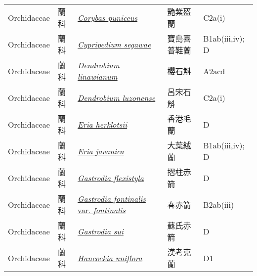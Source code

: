 {\begin{longtable}{p{2.5cm}p{2.5cm}p{4.5cm}p{2.5cm}p{3cm}}
    Orchidaceae & 蘭科 & \href{http://www.theplantlist.org/tpl1.1/search?q=Corybas+puniceus}{\textit{Corybas puniceus} } & 艷紫盔蘭 & C2a(i) \index{Corybas@\textit{Corybas}!puniceus@\textit{puniceus}}  \index{艷紫盔蘭} \\
    Orchidaceae & 蘭科 & \href{http://www.theplantlist.org/tpl1.1/search?q=Cypripedium+segawae}{\textit{Cypripedium segawae} } & 寶島喜普鞋蘭 & B1ab(iii,iv); D \index{Cypripedium@\textit{Cypripedium}!segawae@\textit{segawae}}  \index{寶島喜普鞋蘭} \\
    Orchidaceae & 蘭科 & \href{http://www.theplantlist.org/tpl1.1/search?q=Dendrobium+linawianum}{\textit{Dendrobium linawianum} } & 櫻石斛 & A2acd \index{Dendrobium@\textit{Dendrobium}!linawianum@\textit{linawianum}}  \index{櫻石斛} \\
    Orchidaceae & 蘭科 & \href{http://www.theplantlist.org/tpl1.1/search?q=Dendrobium+luzonense}{\textit{Dendrobium luzonense} } & 呂宋石斛 & C2a(i) \index{Dendrobium@\textit{Dendrobium}!luzonense@\textit{luzonense}}  \index{呂宋石斛} \\
    Orchidaceae & 蘭科 & \href{http://www.theplantlist.org/tpl1.1/search?q=Eria+herklotsii}{\textit{Eria herklotsii} } & 香港毛蘭 & D \index{Eria@\textit{Eria}!herklotsii@\textit{herklotsii}}  \index{香港毛蘭} \\
    Orchidaceae & 蘭科 & \href{http://www.theplantlist.org/tpl1.1/search?q=Eria+javanica}{\textit{Eria javanica} } & 大葉絨蘭 & B1ab(iii,iv); D \index{Eria@\textit{Eria}!javanica@\textit{javanica}}  \index{大葉絨蘭} \\
    Orchidaceae & 蘭科 & \href{http://www.theplantlist.org/tpl1.1/search?q=Gastrodia+flexistyla}{\textit{Gastrodia flexistyla} } & 摺柱赤箭 & D \index{Gastrodia@\textit{Gastrodia}!flexistyla@\textit{flexistyla}}  \index{摺柱赤箭} \\
    Orchidaceae & 蘭科 & \href{http://www.theplantlist.org/tpl1.1/search?q=Gastrodia+fontinalis+var.+fontinalis}{\textit{Gastrodia fontinalis} var. \textit{fontinalis} } & 春赤箭 & B2ab(iii) \index{Gastrodia@\textit{Gastrodia}!fontinalis@\textit{fontinalis}!var. fontinalis@var. \textit{fontinalis}}  \index{春赤箭} \\
    Orchidaceae & 蘭科 & \href{http://www.theplantlist.org/tpl1.1/search?q=Gastrodia+sui}{\textit{Gastrodia sui} } & 蘇氏赤箭 & D \index{Gastrodia@\textit{Gastrodia}!sui@\textit{sui}}  \index{蘇氏赤箭} \\
    Orchidaceae & 蘭科 & \href{http://www.theplantlist.org/tpl1.1/search?q=Hancockia+uniflora}{\textit{Hancockia uniflora} } & 漢考克蘭 & D1 \index{Hancockia@\textit{Hancockia}!uniflora@\textit{uniflora}}  \index{漢考克蘭} \\

\end{longtable}}
